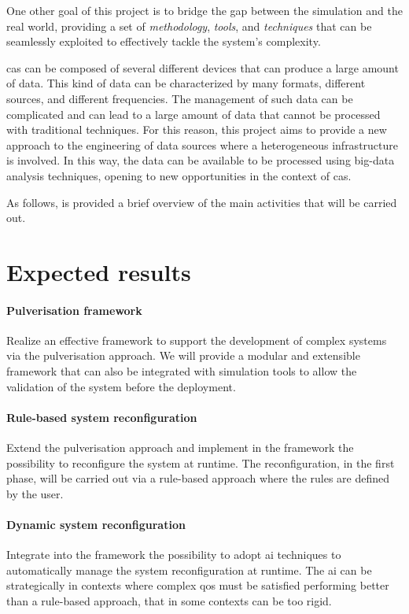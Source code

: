 \documentclass[12pt]{article}
\begin{document}
One other goal of this project is to bridge the gap between the simulation and the real world,
providing a set of \emph{methodology}, \emph{tools}, and \emph{techniques}
that can be seamlessly exploited to effectively tackle the system's complexity.

\ac{cas} can be composed of several different devices that can produce a large amount of data.
%
This kind of data can be characterized by many formats, different sources, and different frequencies.
%
The management of such data can be complicated and can lead to a large amount of data that cannot be processed with traditional techniques.
%
For this reason,
this project aims to provide a new approach to the engineering of data sources where a heterogeneous infrastructure is involved.
%
In this way,
the data can be available to be processed using big-data analysis techniques,
opening to new opportunities in the context of \ac{cas}.

As follows, is provided a brief overview of the main activities that will be carried out.


\section{Expected results}\label{sec:expected-results}

\paragraph{Pulverisation framework}
Realize an effective framework to support the development of complex systems
via the pulverisation approach.
%
We will provide a modular and extensible framework that can also be integrated with simulation tools
to allow the validation of the system before the deployment.

\paragraph{Rule-based system reconfiguration}
Extend the pulverisation approach and implement in the framework the possibility to
reconfigure the system at runtime.
%
The reconfiguration,
in the first phase,
will be carried out via a rule-based approach where the rules are defined by the user.

\paragraph{Dynamic system reconfiguration}
Integrate into the framework the possibility to adopt \ac{ai} techniques to automatically
manage the system reconfiguration at runtime.
%
The \ac{ai} can be strategically in contexts where complex \ac{qos} must be satisfied
performing better than a rule-based approach, that in some contexts can be too rigid.
\end{document}
